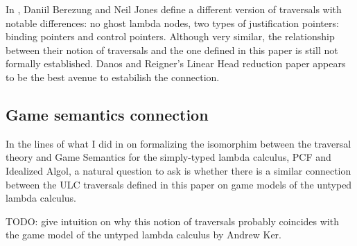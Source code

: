 \documentclass{article}
\theoremstyle{definition}
\begin{document}
In \cite{JonesBerezunLLL}, Daniil Berezung and Neil Jones define a different version of traversals with notable differences: no ghost lambda nodes, two types of justification pointers: binding pointers and control pointers. Although very similar, the relationship between their notion of traversals and the one defined in this paper is still not formally established. Danos and Reigner's Linear Head reduction paper \cite{danos-head} appears to be the best avenue to estabilish the connection.

\subsection{Game semantics connection}

In the lines of what I did in \cite{BlumPhd} on formalizing the isomorphim between the traversal theory and Game Semantics for the simply-typed lambda calculus, PCF and Idealized Algol, a natural question to ask is whether there is a similar connection between the ULC traversals defined in this paper on game models of the untyped lambda calculus.

TODO: give intuition on why this notion of traversals probably coincides with the game model of the untyped lambda calculus by Andrew Ker.





\end{document}

